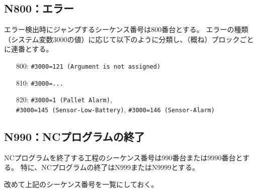 \subsection{N800：エラー\label{subsec:sequenceNerror}\vphantom{\ref{subsec:sequenceNerror}}\TBW}
エラー検出時にジャンプするシーケンス番号は800番台とする。
エラーの種類（システム変数\ttNum3000の値）に応じて以下のように分類し、（概ね）プロックごとに連番とする。
\begin{enumerate}
\item[800:] \verb|#3000=121 (Argument is not assigned)|
\item[810:] \verb|#3000=...|
\item[820:] \verb|#3000=1 (Pallet Alarm)|,\\
            \verb|#3000=145 (Sensor-Low-Battery)|, \verb|#3000=146 (Sensor-Alarm)|
\end{enumerate}


\subsection{N990：NCプログラムの終了\label{subsec:sequenceNprgEnd}}
NCプログラムを終了する工程のシーケンス番号は990番台または9990番台とする。
特に、NCプログラムの終了はN999またはN9999とする。



\clearpage
\noindent
改めて上記のシーケンス番号を一覧にしておく。\\

